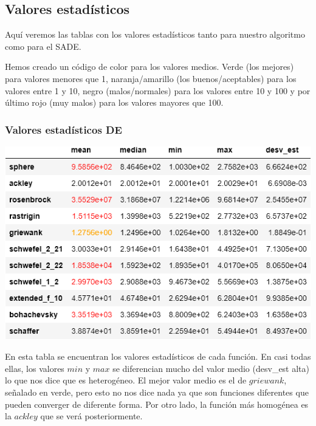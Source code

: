 \documentclass[11pt, a4paper, titlepage]{article}
\begin{document}
\subsection{Valores estadísticos}
Aquí veremos las tablas con los valores estadísticos tanto para nuestro algoritmo como para el SADE. 

\vspace{5mm}

Hemos creado un código de color para los valores medios. Verde (los mejores) para valores menores que 1,  naranja/amarillo (los buenos/aceptables) para los valores entre 1 y 10, negro (malos/normales) para los valores entre 10 y 100 y por último rojo (muy malos) para los valores mayores que 100.
\subsubsection{Valores estadísticos DE}

\vspace{5mm}

\begin{center}
\includegraphics[width=\textwidth]{tableDE.png}
\end{center}
En esta tabla se encuentran los valores estadísticos de cada función. En casi todas ellas, los valores $min$ y $max$  se diferencian mucho del valor medio (desv\_est alta) lo que nos dice que es heterogéneo. El mejor valor medio es el de $griewank$, señalado en verde, pero esto no nos dice nada ya que son funciones diferentes que pueden converger de diferente forma. Por otro lado, la función más homogénea es la $ackley$ que se verá posteriormente.
\end{document}
